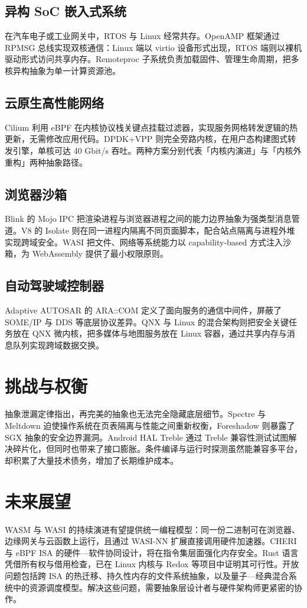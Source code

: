\section{异构 SoC 嵌入式系统}
在汽车电子或工业网关中，RTOS 与 Linux 经常共存。OpenAMP 框架通过 RPMSG 总线实现双核通信：Linux 端以 virtio 设备形式出现，RTOS 端则以裸机驱动形式访问共享内存。Remoteproc 子系统负责加载固件、管理生命周期，把多核异构抽象为单一计算资源池。\par
\section{云原生高性能网络}
Cilium 利用 eBPF 在内核协议栈关键点挂载过滤器，实现服务网格转发逻辑的热更新，无需修改应用代码。DPDK+VPP 则完全旁路内核，在用户态构建图式转发引擎，单核可达 40 Gbit/s 吞吐。两种方案分别代表「内核内演进」与「内核外重构」两种抽象路径。\par
\section{浏览器沙箱}
Blink 的 Mojo IPC 把渲染进程与浏览器进程之间的能力边界抽象为强类型消息管道。V8 的 Isolate 则在同一进程内隔离不同页面脚本，配合站点隔离与进程外堆实现跨域安全。WASI 把文件、网络等系统能力以 capability-based 方式注入沙箱，为 WebAssembly 提供了最小权限原则。\par
\section{自动驾驶域控制器}
Adaptive AUTOSAR 的 ARA::COM 定义了面向服务的通信中间件，屏蔽了 SOME/IP 与 DDS 等底层协议差异。QNX 与 Linux 的混合架构则把安全关键任务放在 QNX 微内核，把多媒体与地图服务放在 Linux 容器，通过共享内存与消息队列实现跨域数据交换。\par
\chapter{挑战与权衡}
抽象泄漏定律指出，再完美的抽象也无法完全隐藏底层细节。Spectre 与 Meltdown 迫使操作系统在页表隔离与性能之间重新权衡，Foreshadow 则暴露了 SGX 抽象的安全边界漏洞。Android HAL Treble 通过 Treble 兼容性测试试图解决碎片化，但同时也带来了接口膨胀。条件编译与运行时探测虽然能兼容多平台，却积累了大量技术债务，增加了长期维护成本。\par
\chapter{未来展望}
WASM 与 WASI 的持续演进有望提供统一编程模型：同一份二进制可在浏览器、边缘网关与云函数上运行，且通过 WASI-NN 扩展直接调用硬件加速器。CHERI 与 eBPF ISA 的硬件—软件协同设计，将在指令集层面强化内存安全。Rust 语言凭借所有权与借用检查，已在 Linux 内核与 Redox 等项目中证明其可行性。开放问题包括跨 ISA 的热迁移、持久性内存的文件系统抽象，以及量子—经典混合系统中的资源调度模型。解决这些问题，需要抽象层设计者与硬件架构师更紧密的协作。\par
